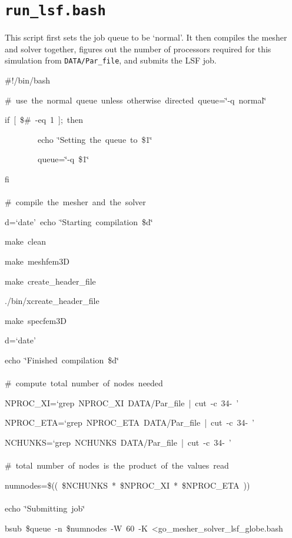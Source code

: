 \documentclass[oneside,english]{book}
\newenvironment{lyxcode}
{\begin{list}{}{
\setlength{\rightmargin}{\leftmargin}
\setlength{\listparindent}{0pt}%
\raggedright
\setlength{\itemsep}{0pt}
\setlength{\parsep}{0pt}
\normalfont\ttfamily}%
 \item[]}
{\end{list}}
\begin{document}
\section{\texttt{run\_lsf.bash}}

This script first sets the job queue to be `normal'. It then compiles
the mesher and solver together, figures out the number of processors
required for this simulation from \texttt{DATA/Par\_file}, and submits
the LSF job.

\begin{lyxcode}
\#!/bin/bash

\#~use~the~normal~queue~unless~otherwise~directed~queue=\char`\"{}-q~normal\char`\"{}~

if~{[}~\$\#~-eq~1~];~then

~~~~~~~~echo~\char`\"{}Setting~the~queue~to~\$1\char`\"{}

~~~~~~~~queue=\char`\"{}-q~\$1\char`\"{}~

fi~\\
~\\
\#~compile~the~mesher~and~the~solver~

d=`date'~echo~\char`\"{}Starting~compilation~\$d\char`\"{}~

make~clean~

make~meshfem3D~

make~create\_header\_file~

./bin/xcreate\_header\_file~

make~specfem3D~

d=`date'~

echo~\char`\"{}Finished~compilation~\$d\char`\"{}~\\
~\\
\#~compute~total~number~of~nodes~needed~

NPROC\_XI=`grep~NPROC\_XI~DATA/Par\_file~|~cut~-c~34-~'~

NPROC\_ETA=`grep~NPROC\_ETA~DATA/Par\_file~|~cut~-c~34-~'~

NCHUNKS=`grep~NCHUNKS~DATA/Par\_file~|~cut~-c~34-~'~\\
~\\
\#~total~number~of~nodes~is~the~product~of~the~values~read~

numnodes=\$((~\$NCHUNKS~{*}~\$NPROC\_XI~{*}~\$NPROC\_ETA~))~\\
~\\
echo~\char`\"{}Submitting~job\char`\"{}~

bsub~\$queue~-n~\$numnodes~-W~60~-K~<go\_mesher\_solver\_lsf\_globe.bash~
\end{lyxcode}
\end{document}
